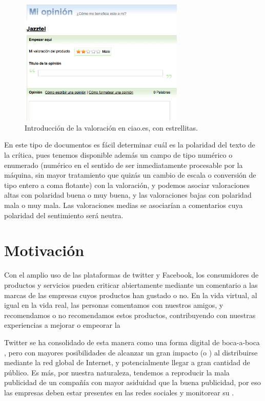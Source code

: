 \begin{figure}[htbp]
\centering
\includegraphics[width=0.7\textwidth]{ciao}
\caption[Introducción de la valoración en ciao.es]{Introducción de la valoración en ciao.es, con estrellitas.}
\label{fig:ciao}
\end{figure}

En este tipo de documentos es fácil determinar cuál es la polaridad del texto de la crítica, pues tenemos disponible además un campo de tipo numérico o enumerado (numérico en el sentido de ser inmediatamente procesable por la máquina, sin mayor tratamiento que quizás un cambio de escala o conversión de tipo entero a coma flotante) con la valoración, y podemos asociar valoraciones altas con polaridad buena o muy buena, y las valoraciones bajas con polaridad mala o muy mala. Las valoraciones medias se asociarían a comentarios cuya polaridad del sentimiento será neutra.

\section{Motivación}

Con el amplio uso de las plataformas de twitter y Facebook, los consumidores de productos y servicios pueden criticar abiertamente mediante un comentario a las marcas de las empresas cuyos productos han gustado o no. En la vida virtual, al igual en la vida real, las personas comentamos con nuestros amigos, y recomendamos o no recomendamos estos productos, contribuyendo con nuestras experiencias a mejorar o empeorar la 

Twitter se ha consolidado de esta manera como una forma digital de boca-a-boca \citep{Jansen2009}, pero con mayores posibilidades de alcanzar un gran impacto (o ) al distribuirse mediante la red global de Internet, y potencialmente llegar a gran cantidad de público. Es más, por nuestra naturaleza, tendemos a reproducir la mala publicidad de un compañía con mayor asiduidad que la buena publicidad, por eso las empresas deben estar presentes en las redes sociales y monitorear su  \citep{Leiva2012}.

